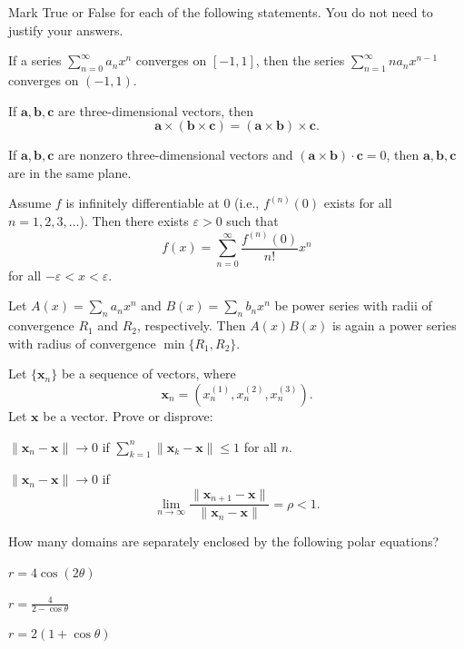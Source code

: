 \begin{problem}
Mark True or False for each of the following statements. You do not need to justify your answers.
\begin{problemchoices}
\item If a series $\displaystyle\sum_{n=0}^{\infty}a_nx^n$ converges on $[-1,1]$, then the series $\displaystyle\sum_{n=1}^{\infty}na_nx^{n-1}$ converges on $(-1,1)$.
\item If $\mathbf a,\mathbf b,\mathbf c$ are three-dimensional vectors, then
\[
\mathbf a\times(\mathbf b\times\mathbf c)=(\mathbf a\times\mathbf b)\times\mathbf c.
\]
\item If $\mathbf a,\mathbf b,\mathbf c$ are nonzero three-dimensional vectors and $(\mathbf a\times\mathbf b)\cdot\mathbf c=0$, then $\mathbf a,\mathbf b,\mathbf c$ are in the same plane.
\item Assume $f$ is infinitely differentiable at $0$ (i.e., $f^{(n)}(0)$ exists for all $n=1,2,3,\ldots$). Then there exists $\varepsilon>0$ such that
\[
f(x)=\sum_{n=0}^{\infty}\frac{f^{(n)}(0)}{n!}x^n
\]
for all $-\varepsilon<x<\varepsilon$.
\item Let $A(x)=\displaystyle\sum_n a_nx^n$ and $B(x)=\displaystyle\sum_n b_nx^n$ be power series with radii of convergence $R_1$ and $R_2$, respectively. Then $A(x)B(x)$ is again a power series with radius of convergence $\min\{R_1,R_2\}$.
\end{problemchoices}
\end{problem}

\begin{problem}
Let $\{\mathbf{x}_n\}$ be a sequence of vectors, where
\[
\mathbf{x}_n=(x_n^{(1)},x_n^{(2)},x_n^{(3)}).
\]
Let $\mathbf{x}$ be a vector. Prove or disprove:
\begin{problemsubparts}
\item $\|\mathbf{x}_n-\mathbf{x}\|\to0$ if $\displaystyle\sum_{k=1}^{n}\|\mathbf{x}_k-\mathbf{x}\|\le1$ for all $n$.
\item $\|\mathbf{x}_n-\mathbf{x}\|\to0$ if
\[
\lim_{n\to\infty}\frac{\|\mathbf{x}_{n+1}-\mathbf{x}\|}{\|\mathbf{x}_n-\mathbf{x}\|}=\rho<1.
\]
\end{problemsubparts}
\end{problem}

\begin{problem}
How many domains are separately enclosed by the following polar equations?
\begin{problemchoices}
\item $r=4\cos(2\theta)$
\item $\displaystyle r=\frac{4}{2-\cos\theta}$
\item $r=2(1+\cos\theta)$
\end{problemchoices}
\end{problem}

